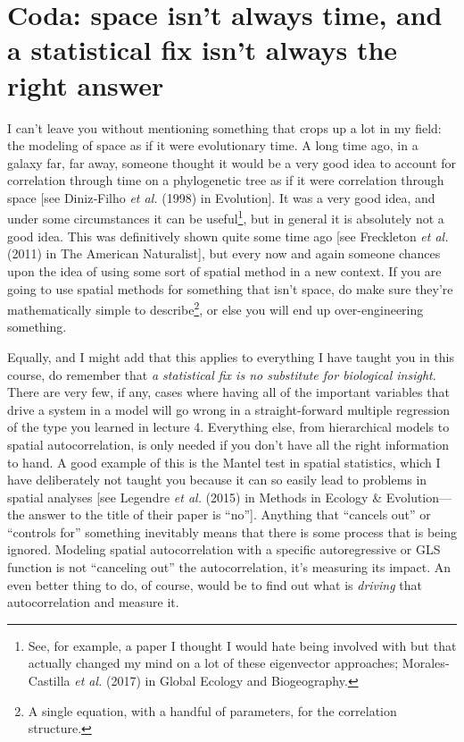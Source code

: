 \section{Coda: space isn't always time, and a statistical fix isn't always the right answer}
I can't leave you without mentioning something that crops up a lot in
my field: the modeling of space as if it were evolutionary time. A
long time ago, in a galaxy far, far away, someone thought it would be
a very good idea to account for correlation through time on a
phylogenetic tree as if it were correlation through space [see
Diniz‐Filho \emph{et al.} (1998) in Evolution]. It was a very good
idea, and under some circumstances it can be useful\footnote{See, for
  example, a paper I thought I would hate being involved with but that
  actually changed my mind on a lot of these eigenvector approaches;
  Morales‐Castilla \emph{et al.} (2017) in Global Ecology and
  Biogeography.}, but in general it is absolutely not a good
idea. This was definitively shown quite some time ago [see Freckleton
\emph{et al.} (2011) in The American Naturalist], but every now and
again someone chances upon the idea of using some sort of spatial
method in a new context. If you are going to use spatial methods for
something that isn't space, do make sure they're mathematically simple
to describe\footnote{A single equation, with a handful of parameters,
  for the correlation structure.}, or else you will end up
over-engineering something.

Equally, and I might add that this applies to everything I have taught
you in this course, do remember that \emph{a statistical fix is no
  substitute for biological insight}. There are very few, if any,
cases where having all of the important variables that drive a system
in a model will go wrong in a straight-forward multiple regression of
the type you learned in lecture 4. Everything else, from hierarchical
models to spatial autocorrelation, is only needed if you don't have
all the right information to hand. A good example of this is the
Mantel test in spatial statistics, which I have deliberately not
taught you because it can so easily lead to problems in spatial
analyses [see Legendre \emph{et al.} (2015) in Methods in Ecology \&
Evolution---the answer to the title of their paper is
``no'']. Anything that ``cancels out'' or ``controls for'' something
inevitably means that there is some process that is being
ignored. Modeling spatial autocorrelation with a specific
autoregressive or GLS function is not ``canceling out'' the
autocorrelation, it's measuring its impact. An even better thing to
do, of course, would be to find out what is \emph{driving} that
autocorrelation and measure it.

